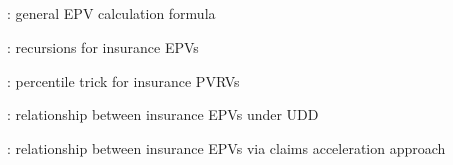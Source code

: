 \subsection*{}
\item {}: general EPV calculation formula
\item {}: recursions for insurance EPVs
\item {}: percentile trick for insurance PVRVs
\item {}: relationship between insurance EPVs under UDD
\item {}: relationship between insurance EPVs via claims acceleration approach
